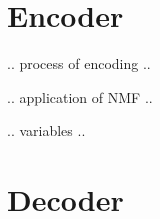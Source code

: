 \section{Encoder}
.. process of encoding ..

.. application of NMF ..

.. variables ..

\section{Decoder}